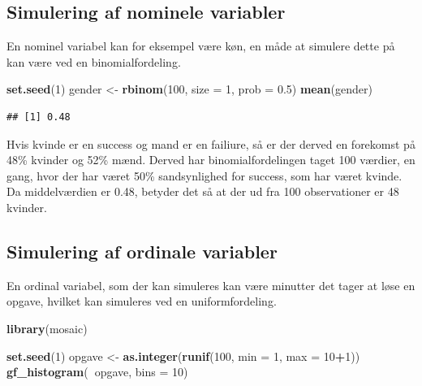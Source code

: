 \documentclass[]{book}
\newenvironment{Shaded}{\begin{snugshade}}{\end{snugshade}}
\newcommand{\DataTypeTok}[1]{\textcolor[rgb]{0.13,0.29,0.53}{#1}}
\newcommand{\DecValTok}[1]{\textcolor[rgb]{0.00,0.00,0.81}{#1}}
\newcommand{\FloatTok}[1]{\textcolor[rgb]{0.00,0.00,0.81}{#1}}
\newcommand{\KeywordTok}[1]{\textcolor[rgb]{0.13,0.29,0.53}{\textbf{#1}}}
\newcommand{\NormalTok}[1]{#1}
\newcommand{\OperatorTok}[1]{\textcolor[rgb]{0.81,0.36,0.00}{\textbf{#1}}}
\newcommand{\StringTok}[1]{\textcolor[rgb]{0.31,0.60,0.02}{#1}}
\theoremstyle{definition}
\theoremstyle{definition}
\theoremstyle{definition}
\theoremstyle{remark}
\begin{document}
\hypertarget{simulering-af-nominele-variabler}{%
\subsection{Simulering af nominele variabler}\label{simulering-af-nominele-variabler}}

En nominel variabel kan for eksempel være køn, en måde at simulere dette på kan være ved en binomialfordeling.

\begin{Shaded}
\begin{Highlighting}[]
\KeywordTok{set.seed}\NormalTok{(}\DecValTok{1}\NormalTok{)}
\NormalTok{gender <-}\StringTok{ }\KeywordTok{rbinom}\NormalTok{(}\DecValTok{100}\NormalTok{, }\DataTypeTok{size =} \DecValTok{1}\NormalTok{, }\DataTypeTok{prob =} \FloatTok{0.5}\NormalTok{)}
\KeywordTok{mean}\NormalTok{(gender)}
\end{Highlighting}
\end{Shaded}

\begin{verbatim}
## [1] 0.48
\end{verbatim}

Hvis kvinde er en success og mand er en failiure, så er der derved en forekomst på 48\% kvinder og 52\% mænd. Derved har binomialfordelingen taget 100 værdier, en gang, hvor der har været 50\% sandsynlighed for success, som har været kvinde. Da middelværdien er 0.48, betyder det så at der ud fra 100 observationer er 48 kvinder.

\hypertarget{simulering-af-ordinale-variabler}{%
\subsection{Simulering af ordinale variabler}\label{simulering-af-ordinale-variabler}}

En ordinal variabel, som der kan simuleres kan være minutter det tager at løse en opgave, hvilket kan simuleres ved en uniformfordeling.

\begin{Shaded}
\begin{Highlighting}[]
\KeywordTok{library}\NormalTok{(mosaic)}
\end{Highlighting}
\end{Shaded}

\begin{Shaded}
\begin{Highlighting}[]
\KeywordTok{set.seed}\NormalTok{(}\DecValTok{1}\NormalTok{)}
\NormalTok{opgave <-}\StringTok{ }\KeywordTok{as.integer}\NormalTok{(}\KeywordTok{runif}\NormalTok{(}\DecValTok{100}\NormalTok{, }\DataTypeTok{min =} \DecValTok{1}\NormalTok{, }\DataTypeTok{max =} \DecValTok{10}\OperatorTok{+}\DecValTok{1}\NormalTok{))}
\KeywordTok{gf_histogram}\NormalTok{(}\OperatorTok{~}\NormalTok{opgave, }\DataTypeTok{bins =} \DecValTok{10}\NormalTok{)}
\end{Highlighting}
\end{Shaded}
\end{document}
